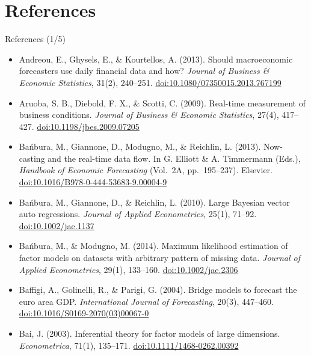 \section{References}

\begin{frame}{References (1/5)}
\itemsize{\tiny}
\begin{itemize}
    \item Andreou, E., Ghysels, E., \& Kourtellos, A. (2013). Should macroeconomic forecasters use daily financial data and how? \textit{Journal of Business \& Economic Statistics}, 31(2), 240--251. \href{https://doi.org/10.1080/07350015.2013.767199}{doi:10.1080/07350015.2013.767199}
    \item Aruoba, S. B., Diebold, F. X., \& Scotti, C. (2009). Real-time measurement of business conditions. \textit{Journal of Business \& Economic Statistics}, 27(4), 417--427. \href{https://doi.org/10.1198/jbes.2009.07205}{doi:10.1198/jbes.2009.07205}
    \item Bańbura, M., Giannone, D., Modugno, M., \& Reichlin, L. (2013). Now-casting and the real-time data flow. In G. Elliott \& A. Timmermann (Eds.), \textit{Handbook of Economic Forecasting} (Vol.\ 2A, pp.\ 195--237). Elsevier. \href{https://doi.org/10.1016/B978-0-444-53683-9.00004-9}{doi:10.1016/B978-0-444-53683-9.00004-9}
    \item Bańbura, M., Giannone, D., \& Reichlin, L. (2010). Large Bayesian vector auto regressions. \textit{Journal of Applied Econometrics}, 25(1), 71--92. \href{https://doi.org/10.1002/jae.1137}{doi:10.1002/jae.1137}
    \item Bańbura, M., \& Modugno, M. (2014). Maximum likelihood estimation of factor models on datasets with arbitrary pattern of missing data. \textit{Journal of Applied Econometrics}, 29(1), 133--160. \href{https://doi.org/10.1002/jae.2306}{doi:10.1002/jae.2306}
    \item Baffigi, A., Golinelli, R., \& Parigi, G. (2004). Bridge models to forecast the euro area GDP. \textit{International Journal of Forecasting}, 20(3), 447--460. \href{https://doi.org/10.1016/S0169-2070(03)00067-0}{doi:10.1016/S0169-2070(03)00067-0}
    \item Bai, J. (2003). Inferential theory for factor models of large dimensions. \textit{Econometrica}, 71(1), 135--171. \href{https://doi.org/10.1111/1468-0262.00392}{doi:10.1111/1468-0262.00392}

\end{itemize}
\end{frame}
